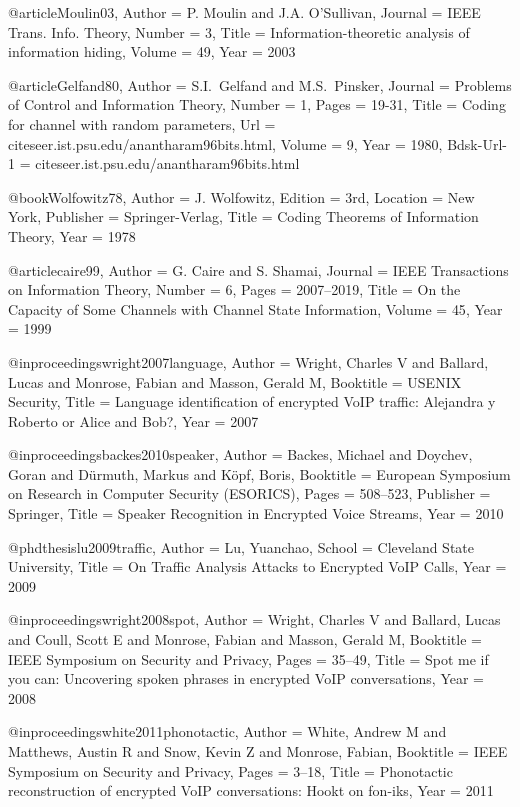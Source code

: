 {{{{{{{	@article{Moulin03,
	Author = {P. Moulin and J.A. O'Sullivan},
	Journal = {IEEE Trans. Info. Theory},
	Number = {3},
	Title = {Information-theoretic analysis of information hiding},
	Volume = 49,
	Year = 2003}
	
	@article{Gelfand80,
	Author = {S.I.~Gelfand and M.S.~Pinsker},
	Journal = {Problems of Control and Information Theory},
	Number = {1},
	Pages = {19-31},
	Title = {{Coding for channel with random parameters}},
	Url = {citeseer.ist.psu.edu/anantharam96bits.html},
	Volume = {9},
	Year = {1980},
	Bdsk-Url-1 = {citeseer.ist.psu.edu/anantharam96bits.html}}
	
	@book{Wolfowitz78,
	Author = {J. Wolfowitz},
	Edition = {3rd},
	Location = {New York},
	Publisher = {Springer-Verlag},
	Title = {Coding Theorems of Information Theory},
	Year = 1978}
	
	@article{caire99,
	Author = {G. Caire and S. Shamai},
	Journal = {IEEE Transactions on Information Theory},
	Number = {6},
	Pages = {2007--2019},
	Title = {On the Capacity of Some Channels with Channel State Information},
	Volume = {45},
	Year = {1999}}
	
	@inproceedings{wright2007language,
	Author = {Wright, Charles V and Ballard, Lucas and Monrose, Fabian and Masson, Gerald M},
	Booktitle = {USENIX Security},
	Title = {{Language identification of encrypted VoIP traffic: Alejandra y Roberto or Alice and Bob?}},
	Year = {2007}}
	
	@inproceedings{backes2010speaker,
	Author = {Backes, Michael and Doychev, Goran and D{\"u}rmuth, Markus and K{\"o}pf, Boris},
	Booktitle = {{European Symposium on Research in Computer Security (ESORICS)}},
	Pages = {508--523},
	Publisher = {Springer},
	Title = {{Speaker Recognition in Encrypted Voice Streams}},
	Year = {2010}}
	
	@phdthesis{lu2009traffic,
	Author = {Lu, Yuanchao},
	School = {Cleveland State University},
	Title = {{On Traffic Analysis Attacks to Encrypted VoIP Calls}},
	Year = {2009}}
	
	@inproceedings{wright2008spot,
	Author = {Wright, Charles V and Ballard, Lucas and Coull, Scott E and Monrose, Fabian and Masson, Gerald M},
	Booktitle = {IEEE Symposium on Security and Privacy},
	Pages = {35--49},
	Title = {Spot me if you can: Uncovering spoken phrases in encrypted VoIP conversations},
	Year = {2008}}
	
	@inproceedings{white2011phonotactic,
	Author = {White, Andrew M and Matthews, Austin R and Snow, Kevin Z and Monrose, Fabian},
	Booktitle = {IEEE Symposium on Security and Privacy},
	Pages = {3--18},
	Title = {Phonotactic reconstruction of encrypted VoIP conversations: Hookt on fon-iks},
	Year = {2011}}
	
}}}}}}}
